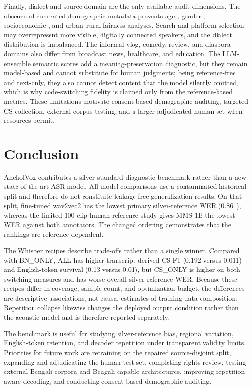 \documentclass[journal]{IEEEtran}
\begin{document}
Finally, dialect and source domain are the only available audit dimensions.
The absence of consented demographic metadata prevents age-, gender-,
socioeconomic-, and urban--rural fairness analyses. Search and platform
selection may overrepresent more visible, digitally connected speakers, and the
dialect distribution is imbalanced. The informal vlog, comedy, review, and
diaspora domains also differ from broadcast news, healthcare, and education.
The LLM-ensemble semantic scores add a meaning-preservation diagnostic, but
they remain model-based and cannot substitute for human judgments; being
reference-free and text-only, they also cannot detect content that the model
silently omitted, which is why code-switching fidelity is claimed only from the
reference-based metrics. These
limitations motivate consent-based demographic auditing, targeted CS
collection, external-corpus testing, and a larger adjudicated human set when resources
permit.






% 
\section{Conclusion}
\label{sec:conclusion}

AncholVox contributes a silver-standard diagnostic benchmark rather than a new
state-of-the-art ASR model. All model comparisons use a contaminated historical
split and therefore do not constitute leakage-free generalization results. On
that split, fine-tuned wav2vec2 has the lowest primary silver-reference WER
(0.861), whereas the limited 100-clip human-reference study gives MMS-1B the
lowest WER against both annotators. The changed ordering demonstrates that the
rankings are reference-dependent.

The Whisper recipes describe trade-offs rather than a single winner. Compared
with BN\_ONLY, ALL has higher transcript-derived CS-F1 (0.192 versus 0.011) and
English-token survival (0.13 versus 0.01), but CS\_ONLY is higher on both
switching measures and has worse overall silver-reference WER. Because these
recipes differ in coverage, sample count, and optimization budget, the
differences are descriptive associations, not causal estimates of training-data
composition. Repetition collapse likewise changes the deployed output condition
rather than the acoustic model and is therefore reported separately.

The benchmark is useful for studying silver-reference bias, regional variation,
English-token retention, and decoder repetition under transparent validity
limits. Priorities for future work are retraining on the repaired source-disjoint
split, expanding and adjudicating the human test set, completing rights review,
testing external Bengali corpora and Bengali-capable architectures, improving
repetition-aware decoding, and conducting consent-based demographic auditing.
\end{document}
